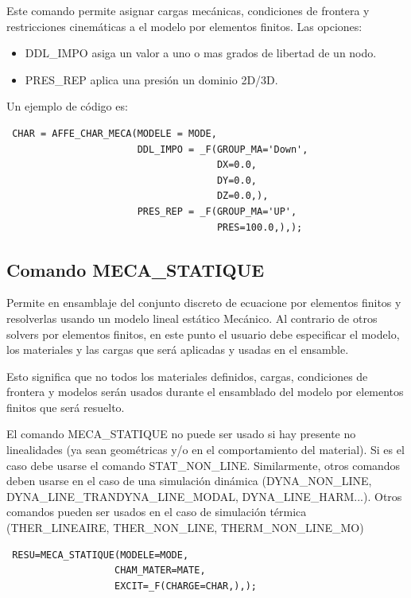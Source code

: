 \documentclass[12pt]{book}
\theoremstyle{definition}
\theoremstyle{remark}
\theoremstyle{plain}
\begin{document}
Este comando permite asignar cargas mecánicas, condiciones de frontera y restricciones
cinemáticas a el modelo por elementos finitos. Las opciones:
\begin{itemize}
 \item DDL\_IMPO asiga un valor a uno o mas grados de libertad de un nodo.
 \item PRES\_REP aplica una presión un dominio 2D/3D.
\end{itemize}

Un ejemplo de código es:

\begin{verbatim}
 CHAR = AFFE_CHAR_MECA(MODELE = MODE, 
                       DDL_IMPO = _F(GROUP_MA='Down',
                                     DX=0.0,
                                     DY=0.0,
                                     DZ=0.0,),
                       PRES_REP = _F(GROUP_MA='UP',
                                     PRES=100.0,),);
\end{verbatim}

\subsection{Comando MECA\_STATIQUE}

Permite en ensamblaje del conjunto discreto de ecuacione por elementos finitos 
y resolverlas usando un modelo lineal estático Mecánico. Al contrario de otros solvers 
por elementos finitos, en este punto el usuario debe especificar el modelo, 
los materiales y las cargas que será aplicadas y usadas en el ensamble.

Esto significa que no todos los materiales definidos, cargas, condiciones de 
frontera y modelos serán usados durante el ensamblado del modelo por elementos
finitos que será resuelto.

El comando MECA\_STATIQUE no puede ser usado si hay presente no linealidades (ya sean 
geométricas y/o en el comportamiento del material). Si es el caso debe usarse 
el comando STAT\_NON\_LINE. Similarmente, otros comandos deben usarse en el caso de 
una simulación dinámica (DYNA\_NON\_LINE, DYNA\_LINE\_TRAN\/DYNA\_LINE\_MODAL, 
DYNA\_LINE\_HARM...). Otros comandos pueden ser usados en el caso de simulación térmica
 (THER\_LINEAIRE, THER\_NON\_LINE, THERM\_NON\_LINE\_MO)


\begin{verbatim}
 RESU=MECA_STATIQUE(MODELE=MODE,
                   CHAM_MATER=MATE,
                   EXCIT=_F(CHARGE=CHAR,),);
\end{verbatim} 
\end{document}
